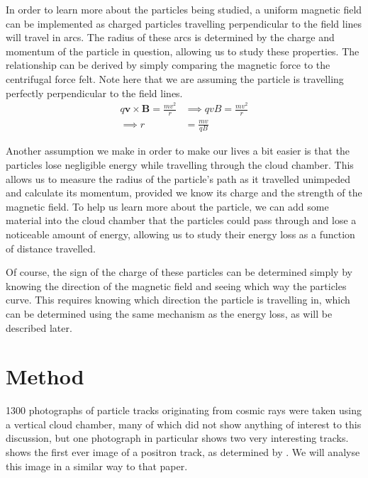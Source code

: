 \documentclass[11pt]{article}
\newcommand{\mb}[1]{\mathbf{#1}}
\numberwithin{equation}{section}
\numberwithin{figure}{section}
\numberwithin{table}{section}
\begin{document}
In order to learn more about the particles being studied, a uniform magnetic field can be implemented as charged particles travelling perpendicular to the field lines will travel in arcs. The radius of these arcs is determined by the charge and momentum of the particle in question, allowing us to study these properties. The relationship can be derived by simply comparing the magnetic force to the centrifugal force felt. Note here that we are assuming the particle is travelling perfectly perpendicular to the field lines.
\begin{align}
    q \mb{v}\times\mb{B}=\frac{mv^2}{r} &\implies qvB=\frac{mv^2}{r}\nonumber\\
    \implies r&=\frac{mv}{qB} \label{eqn:radius}
\end{align}

Another assumption we make in order to make our lives a bit easier is that the particles lose negligible energy while travelling through the cloud chamber. This allows us to measure the radius of the particle's path as it travelled unimpeded and calculate its momentum, provided we know its charge and the strength of the magnetic field. To help us learn more about the particle, we can add some material into the cloud chamber that the particles could pass through and lose a noticeable amount of energy, allowing us to study their energy loss as a function of distance travelled. 

Of course, the sign of the charge of these particles can be determined simply by knowing the direction of the magnetic field and seeing which way the particles curve. This requires knowing which direction the particle is travelling in, which can be determined using the same mechanism as the energy loss, as will be described later. 

\section{Method}\label{sec:Method}
1300 photographs of particle tracks originating from cosmic rays were taken using a vertical cloud chamber, many of which did not show anything of interest to this discussion, but one photograph in particular shows two very interesting tracks.  shows the first ever image of a positron track, as determined by \cite{Pos_Electron}. We will analyse this image in a similar way to that paper.
\end{document}
